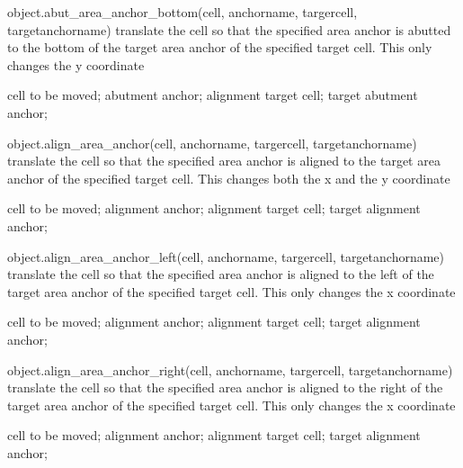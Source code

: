 \begin{APIfunc}{object.abut\_area\_anchor\_bottom(cell, anchorname, targercell, targetanchorname)}
    translate the cell so that the specified area anchor is abutted to the bottom of the target area anchor of the specified target cell. This only changes the y coordinate
    \begin{APIparameters}
            cell to be moved;
            abutment anchor;
            alignment target cell;
            target abutment anchor;
    \end{APIparameters}
\end{APIfunc}
\begin{APIfunc}{object.align\_area\_anchor(cell, anchorname, targercell, targetanchorname)}
    translate the cell so that the specified area anchor is aligned to the target area anchor of the specified target cell. This changes both the x and the y coordinate
    \begin{APIparameters}
            cell to be moved;
            alignment anchor;
            alignment target cell;
            target alignment anchor;
    \end{APIparameters}
\end{APIfunc}
\begin{APIfunc}{object.align\_area\_anchor\_left(cell, anchorname, targercell, targetanchorname)}
    translate the cell so that the specified area anchor is aligned to the left of the target area anchor of the specified target cell. This only changes the x coordinate
    \begin{APIparameters}
            cell to be moved;
            alignment anchor;
            alignment target cell;
            target alignment anchor;
    \end{APIparameters}
\end{APIfunc}
\begin{APIfunc}{object.align\_area\_anchor\_right(cell, anchorname, targercell, targetanchorname)}
    translate the cell so that the specified area anchor is aligned to the right of the target area anchor of the specified target cell. This only changes the x coordinate
    \begin{APIparameters}
            cell to be moved;
            alignment anchor;
            alignment target cell;
            target alignment anchor;
    \end{APIparameters}
\end{APIfunc}

